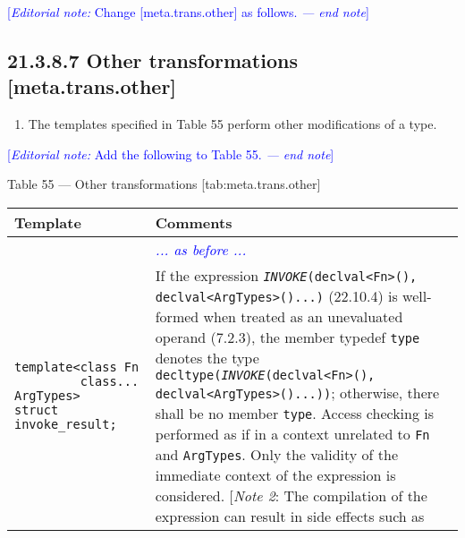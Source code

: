 \documentclass{article}
\begin{document}
\textcolor{blue}{[\textit{Editorial note:} Change [meta.trans.other] as follows. \textit{--- end note}]}

\subsection*{21.3.8.7 Other transformations [meta.trans.other]}

\begin{enumerate}
\item The templates specified in Table 55 perform other modifications of a type.
\end{enumerate}

\textcolor{blue}{[\textit{Editorial note:} Add the following to Table 55. \textit{--- end note}]}
  
\begin{center}
  Table 55 — Other transformations [tab:meta.trans.other]
  \begin{tabular}[t]{ | p{6cm} p{12cm} | }
    \hline
    Template & Comments \\ 
    \hline\hline
    & \textcolor{blue}{\textit{... as before ...}} \\
    \hline
    \makecell[l]{\texttt{template<class Fn} \\
                 \texttt{\ \ \ \ \ \ \ \ \ class... ArgTypes>} \\
                 \texttt{struct invoke\_result;}} &
    \makecell[l]{If the expression \texttt{\textit{INVOKE}(declval<Fn>(),} \\
                 \texttt{declval<ArgTypes>()...)} (22.10.4) is well-formed when treated as \\
                 an unevaluated operand (7.2.3), the member typedef \texttt{type} denotes \\
                 the type \texttt{decltype(\textit{INVOKE}(declval<Fn>(),} \\
                 \texttt{declval<ArgTypes>()...))}; otherwise, there shall be no member \\
                 \texttt{type}. Access checking is performed as if in a context unrelated to \texttt{Fn} \\
                 and \texttt{ArgTypes}. Only the validity of the immediate context of the \\
                 expression is considered. \\
                 $[$\textit{Note 2}: The compilation of the expression can result in side effects such as \\
}
\end{tabular}
\end{center}
\end{document}
